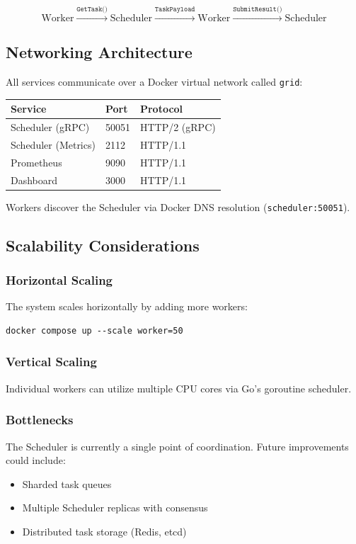 \[
\text{Worker} \xrightarrow{\texttt{GetTask()}} \text{Scheduler} \xrightarrow{\texttt{TaskPayload}} \text{Worker} \xrightarrow{\texttt{SubmitResult()}} \text{Scheduler}
\]

\subsection{Networking Architecture}

All services communicate over a Docker virtual network called \texttt{grid}:

\begin{center}
\begin{tabular}{|l|l|l|}
\hline
\textbf{Service} & \textbf{Port} & \textbf{Protocol} \\
\hline
Scheduler (gRPC) & 50051 & HTTP/2 (gRPC) \\
Scheduler (Metrics) & 2112 & HTTP/1.1 \\
Prometheus & 9090 & HTTP/1.1 \\
Dashboard & 3000 & HTTP/1.1 \\
\hline
\end{tabular}
\end{center}

Workers discover the Scheduler via Docker DNS resolution (\texttt{scheduler:50051}).

\subsection{Scalability Considerations}

\subsubsection{Horizontal Scaling}
The system scales horizontally by adding more workers:
\begin{verbatim}
docker compose up --scale worker=50
\end{verbatim}

\subsubsection{Vertical Scaling}
Individual workers can utilize multiple CPU cores via Go's goroutine scheduler.

\subsubsection{Bottlenecks}
The Scheduler is currently a single point of coordination. Future improvements could include:
\begin{itemize}
    \item Sharded task queues
    \item Multiple Scheduler replicas with consensus
    \item Distributed task storage (Redis, etcd)
\end{itemize}

